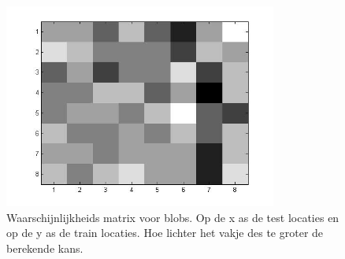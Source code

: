\documentclass[a4paper]{article}
\begin{document}
\begin{figure}[h]
	\centering
	\includegraphics[width=0.8\textwidth]{blob_prob.jpg}
	\caption{Waarschijnlijkheids matrix voor blobs. Op de x as de test locaties en op de y as de train locaties. Hoe lichter het vakje des te groter de berekende kans.}
	\label{fig:blob_prob}
\end{figure}
\end{document}
